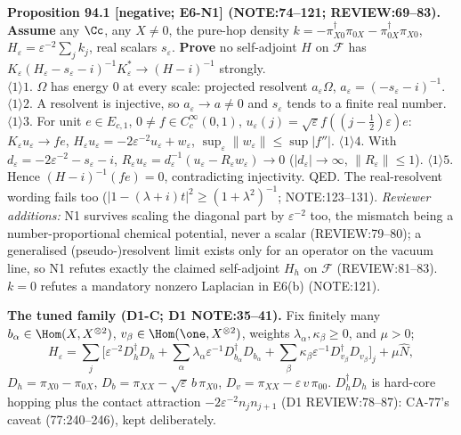 \textbf{Proposition 94.1 [negative; E6-N1] (NOTE:74--121; REVIEW:69--83).}  \textbf{Assume} any \(\Cc\), any \(X\neq0\), the
pure-hop density \(k=-\pi_{X0}^\dagger\pi_{0X}-\pi_{0X}^\dagger\pi_{X0}\), \(H_\varepsilon=\varepsilon^{-2}\sum_jk_j\), real scalars \(s_\varepsilon\).
\textbf{Prove} no self-adjoint \(H\) on \(\mathcal F\) has \(K_\varepsilon(H_\varepsilon-s_\varepsilon-i)^{-1}K_\varepsilon^*\to(H-i)^{-1}\) strongly.\\
\(\langle1\rangle1\). \(\Omega\) has energy \(0\) at every scale: projected resolvent \(a_\varepsilon\Omega\), \(a_\varepsilon=(-s_\varepsilon-i)^{-1}\).  \(\langle1\rangle2\). A
resolvent is injective, so \(a_\varepsilon\to a\neq0\) and \(s_\varepsilon\) tends to a finite real number.  \(\langle1\rangle3\). For unit \(e\in E_{c,1}\),
\(0\neq f\in C_c^\infty(0,1)\), \(u_\varepsilon(j)=\sqrt\varepsilon f((j-\tfrac12)\varepsilon)e\): \(K_\varepsilon u_\varepsilon\to fe\), \(H_\varepsilon u_\varepsilon=-2\varepsilon^{-2}u_\varepsilon+w_\varepsilon\),
\(\sup_\varepsilon\|w_\varepsilon\|\le\sup|f''|\).  \(\langle1\rangle4\). With \(d_\varepsilon=-2\varepsilon^{-2}-s_\varepsilon-i\), \(R_\varepsilon u_\varepsilon=d_\varepsilon^{-1}(u_\varepsilon-R_\varepsilon w_\varepsilon)\to0\)
(\(|d_\varepsilon|\to\infty\), \(\|R_\varepsilon\|\le1\)).  \(\langle1\rangle5\). Hence \((H-i)^{-1}(fe)=0\), contradicting injectivity.  QED.
The real-resolvent wording fails too (\(|1-(\lambda+i)t|^2\ge(1+\lambda^2)^{-1}\); NOTE:123--131).  \emph{Reviewer additions:} N1 survives
scaling the diagonal part by \(\varepsilon^{-2}\) too, the mismatch being a number-proportional chemical potential, never a scalar
(REVIEW:79--80); a generalised (pseudo-)resolvent limit exists only for an operator on the vacuum line, so N1 refutes exactly
the claimed self-adjoint \(H_h\) on \(\mathcal F\) (REVIEW:81--83).  \(k=0\) refutes a mandatory nonzero Laplacian in E6(b) (NOTE:121).

\textbf{The tuned family (D1-C; D1 NOTE:35--41).}  Fix finitely many \(b_\alpha\in\Hom(X,X^{\otimes2})\),
\(v_\beta\in\Hom(\one,X^{\otimes2})\), weights \(\lambda_\alpha,\kappa_\beta\ge0\), and \(\mu>0\);
\[
  H_\varepsilon=\sum_j\Big[\varepsilon^{-2}D_h^\dagger D_h+\sum_\alpha\lambda_\alpha\varepsilon^{-1}D_{b_\alpha}^\dagger D_{b_\alpha}
  +\sum_\beta\kappa_\beta\varepsilon^{-1}D_{v_\beta}^\dagger D_{v_\beta}\Big]_j+\mu\hat N,
\]
\(D_h=\pi_{X0}-\pi_{0X}\), \(D_b=\pi_{XX}-\sqrt\varepsilon\,b\,\pi_{X0}\), \(D_v=\pi_{XX}-\varepsilon\,v\,\pi_{00}\).  \(D_h^\dagger D_h\) is hard-core hopping
plus the contact attraction \(-2\varepsilon^{-2}n_jn_{j+1}\) (D1 REVIEW:78--87): CA-77's caveat (77:240--246), kept deliberately.

